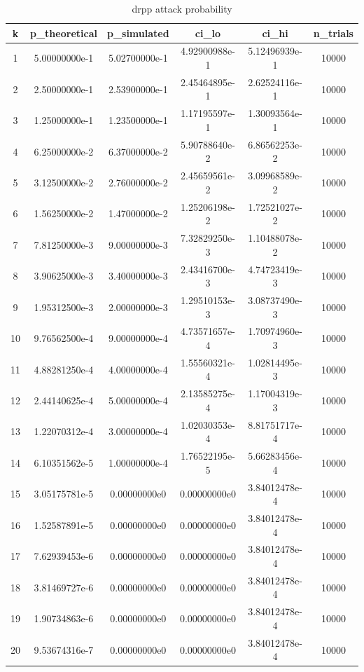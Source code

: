 \begin{table}[h]
\centering
\begin{tabular}{|c|c|c|c|c|c|}
\hline
k & p_theoretical & p_simulated & ci_lo & ci_hi & n_trials \\ \hline
1 & 5.00000000e-1 & 5.02700000e-1 & 4.92900988e-1 & 5.12496939e-1 & 10000 \\
2 & 2.50000000e-1 & 2.53900000e-1 & 2.45464895e-1 & 2.62524116e-1 & 10000 \\
3 & 1.25000000e-1 & 1.23500000e-1 & 1.17195597e-1 & 1.30093564e-1 & 10000 \\
4 & 6.25000000e-2 & 6.37000000e-2 & 5.90788640e-2 & 6.86562253e-2 & 10000 \\
5 & 3.12500000e-2 & 2.76000000e-2 & 2.45659561e-2 & 3.09968589e-2 & 10000 \\
6 & 1.56250000e-2 & 1.47000000e-2 & 1.25206198e-2 & 1.72521027e-2 & 10000 \\
7 & 7.81250000e-3 & 9.00000000e-3 & 7.32829250e-3 & 1.10488078e-2 & 10000 \\
8 & 3.90625000e-3 & 3.40000000e-3 & 2.43416700e-3 & 4.74723419e-3 & 10000 \\
9 & 1.95312500e-3 & 2.00000000e-3 & 1.29510153e-3 & 3.08737490e-3 & 10000 \\
10 & 9.76562500e-4 & 9.00000000e-4 & 4.73571657e-4 & 1.70974960e-3 & 10000 \\
11 & 4.88281250e-4 & 4.00000000e-4 & 1.55560321e-4 & 1.02814495e-3 & 10000 \\
12 & 2.44140625e-4 & 5.00000000e-4 & 2.13585275e-4 & 1.17004319e-3 & 10000 \\
13 & 1.22070312e-4 & 3.00000000e-4 & 1.02030353e-4 & 8.81751717e-4 & 10000 \\
14 & 6.10351562e-5 & 1.00000000e-4 & 1.76522195e-5 & 5.66283456e-4 & 10000 \\
15 & 3.05175781e-5 & 0.00000000e0 & 0.00000000e0 & 3.84012478e-4 & 10000 \\
16 & 1.52587891e-5 & 0.00000000e0 & 0.00000000e0 & 3.84012478e-4 & 10000 \\
17 & 7.62939453e-6 & 0.00000000e0 & 0.00000000e0 & 3.84012478e-4 & 10000 \\
18 & 3.81469727e-6 & 0.00000000e0 & 0.00000000e0 & 3.84012478e-4 & 10000 \\
19 & 1.90734863e-6 & 0.00000000e0 & 0.00000000e0 & 3.84012478e-4 & 10000 \\
20 & 9.53674316e-7 & 0.00000000e0 & 0.00000000e0 & 3.84012478e-4 & 10000 \\
\hline
\end{tabular}
\caption{drpp attack probability}
\label{tab:T01}
\end{table}
